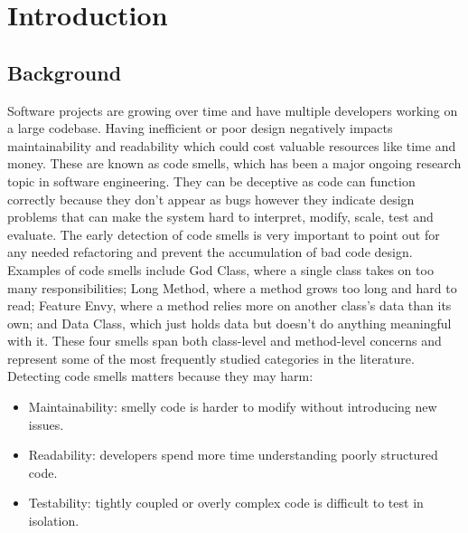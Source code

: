 \section{Introduction}
\label{sec:introduction}

\subsection{Background}
\label{subsec:background}
Software projects are growing over time and have multiple developers working on a large codebase. Having inefficient or poor design negatively impacts maintainability and readability which could cost valuable resources like time and money. These are known as code smells, which has been a major ongoing research topic in software engineering. They can be deceptive as code can function correctly because they don’t appear as bugs however they indicate design problems that can make the system hard to interpret, modify, scale, test and evaluate. The early detection of code smells is very important to point out for any needed refactoring and prevent the accumulation of bad code design. 
Examples of code smells include God Class, where a single class takes on too many responsibilities; Long Method, where a method grows too long and hard to read; Feature Envy, where a method relies more on another class's data than its own; and Data Class, which just holds data but doesn't do anything meaningful with it. These four smells span both class-level and method-level concerns and represent some of the most frequently studied categories in the literature. Detecting code smells matters because they may harm:
\begin{itemize}
    \item Maintainability: smelly code is harder to modify without introducing new issues.
\end{itemize}
\begin{itemize}
    \item Readability: developers spend more time understanding poorly structured code.
\end{itemize}
\begin{itemize}
    \item Testability: tightly coupled or overly complex code is difficult to test in isolation.
\end{itemize}

